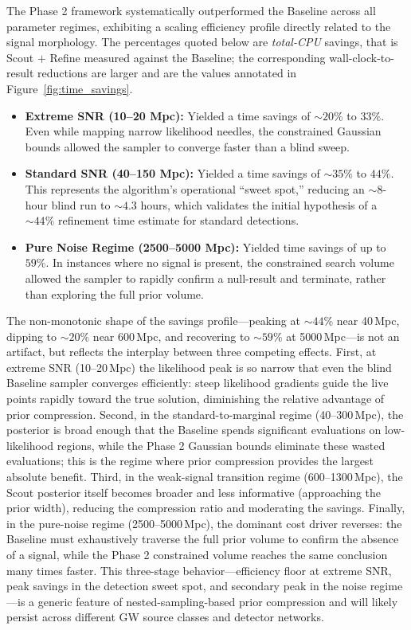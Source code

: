 \documentclass[12pt]{article}
\begin{document}
The Phase 2 framework systematically outperformed the Baseline across all parameter regimes, exhibiting a scaling efficiency profile directly related to the signal morphology. The percentages quoted below are \emph{total-CPU} savings, that is Scout $+$ Refine measured against the Baseline; the corresponding wall-clock-to-result reductions are larger and are the values annotated in Figure~\ref{fig:time_savings}.
\begin{itemize}
    \item \textbf{Extreme SNR (10--20 Mpc):} Yielded a time savings of $\sim 20\%$ to $33\%$. Even while mapping narrow likelihood needles, the constrained Gaussian bounds allowed the sampler to converge faster than a blind sweep.
    \item \textbf{Standard SNR (40--150 Mpc):} Yielded a time savings of $\sim 35\%$ to $44\%$. This represents the algorithm's operational ``sweet spot,'' reducing an $\sim 8$-hour blind run to $\sim 4.3$ hours, which validates the initial hypothesis of a $\sim 44\%$ refinement time estimate for standard detections.
    \item \textbf{Pure Noise Regime (2500--5000 Mpc):} Yielded time savings of up to $59\%$. In instances where no signal is present, the constrained search volume allowed the sampler to rapidly confirm a null-result and terminate, rather than exploring the full prior volume.
\end{itemize}

The non-monotonic shape of the savings profile---peaking at $\sim 44\%$ near 40\,Mpc, dipping to $\sim 20\%$ near 600\,Mpc, and recovering to $\sim 59\%$ at 5000\,Mpc---is not an artifact, but reflects the interplay between three competing effects. First, at extreme SNR (10--20\,Mpc) the likelihood peak is so narrow that even the blind Baseline sampler converges efficiently: steep likelihood gradients guide the live points rapidly toward the true solution, diminishing the relative advantage of prior compression. Second, in the standard-to-marginal regime (40--300\,Mpc), the posterior is broad enough that the Baseline spends significant evaluations on low-likelihood regions, while the Phase 2 Gaussian bounds eliminate these wasted evaluations; this is the regime where prior compression provides the largest absolute benefit. Third, in the weak-signal transition regime (600--1300\,Mpc), the Scout posterior itself becomes broader and less informative (approaching the prior width), reducing the compression ratio and moderating the savings. Finally, in the pure-noise regime (2500--5000\,Mpc), the dominant cost driver reverses: the Baseline must exhaustively traverse the full prior volume to confirm the absence of a signal, while the Phase 2 constrained volume reaches the same conclusion many times faster. This three-stage behavior---efficiency floor at extreme SNR, peak savings in the detection sweet spot, and secondary peak in the noise regime---is a generic feature of nested-sampling-based prior compression and will likely persist across different GW source classes and detector networks.
\end{document}
